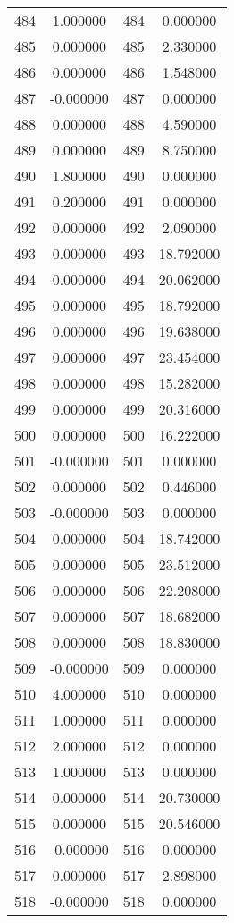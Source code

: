 \documentclass[12pt]{article}
\begin{document}
\begin{longtable}{@{}cccc@{}}
484 & 1.000000 & 484 & 0.000000 \\
485 & 0.000000 & 485 & 2.330000 \\
486 & 0.000000 & 486 & 1.548000 \\
487 & -0.000000 & 487 & 0.000000 \\
488 & 0.000000 & 488 & 4.590000 \\
489 & 0.000000 & 489 & 8.750000 \\
490 & 1.800000 & 490 & 0.000000 \\
491 & 0.200000 & 491 & 0.000000 \\
492 & 0.000000 & 492 & 2.090000 \\
493 & 0.000000 & 493 & 18.792000 \\
494 & 0.000000 & 494 & 20.062000 \\
495 & 0.000000 & 495 & 18.792000 \\
496 & 0.000000 & 496 & 19.638000 \\
497 & 0.000000 & 497 & 23.454000 \\
498 & 0.000000 & 498 & 15.282000 \\
499 & 0.000000 & 499 & 20.316000 \\
500 & 0.000000 & 500 & 16.222000 \\
501 & -0.000000 & 501 & 0.000000 \\
502 & 0.000000 & 502 & 0.446000 \\
503 & -0.000000 & 503 & 0.000000 \\
504 & 0.000000 & 504 & 18.742000 \\
505 & 0.000000 & 505 & 23.512000 \\
506 & 0.000000 & 506 & 22.208000 \\
507 & 0.000000 & 507 & 18.682000 \\
508 & 0.000000 & 508 & 18.830000 \\
509 & -0.000000 & 509 & 0.000000 \\
510 & 4.000000 & 510 & 0.000000 \\
511 & 1.000000 & 511 & 0.000000 \\
512 & 2.000000 & 512 & 0.000000 \\
513 & 1.000000 & 513 & 0.000000 \\
514 & 0.000000 & 514 & 20.730000 \\
515 & 0.000000 & 515 & 20.546000 \\
516 & -0.000000 & 516 & 0.000000 \\
517 & 0.000000 & 517 & 2.898000 \\
518 & -0.000000 & 518 & 0.000000 \\

\end{longtable}
\end{document}
